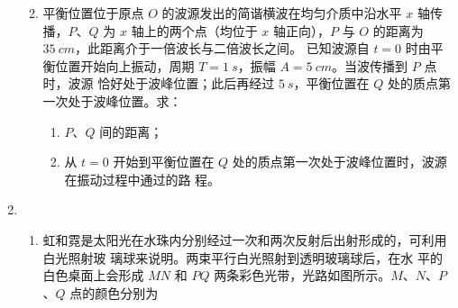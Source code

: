 \begin{enumerate}
\begin{enumerate}

\item 
平衡位置位于原点 $ O $ 的波源发出的简谐横波在均匀介质中沿水平 $ x $ 轴传播，$ P $、$ Q $ 为 $ x $
轴上的两个点（均位于 $ x $ 轴正向），$ P $ 与 $ O $ 的距离为 $ 35 \ cm $，此距离介于一倍波长与二倍波长之间。
已知波源自 $ t=0 $ 时由平衡位置开始向上振动，周期 $ T=1 \ s $，振幅 $ A=5 \ cm $。当波传播到 $ P $ 点时，波源
恰好处于波峰位置；此后再经过 $ 5 \ s $，平衡位置在 $ Q $ 处的质点第一次处于波峰位置。求：
\begin{enumerate}
	\item
$ P $、$ Q $ 间的距离；
\item 
从 $ t=0 $ 开始到平衡位置在 $ Q $ 处的质点第一次处于波峰位置时，波源在振动过程中通过的路
程。
\end{enumerate}




\end{enumerate}

\item 
{}
\begin{enumerate}
	\item
虹和霓是太阳光在水珠内分别经过一次和两次反射后出射形成的，可利用白光照射玻
璃球来说明。两束平行白光照射到透明玻璃球后，在水
平的白色桌面上会形成 $ MN $ 和 $ PQ $ 两条彩色光带，光路如图所示。$ M $、$ N $、$ P $、$ Q $ 点的颜色分别为  
\begin{figure}[h!]
	\centering
	
\end{figure}


\end{enumerate}
\end{enumerate}
